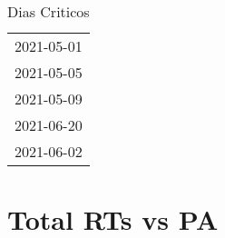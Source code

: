 \documentclass[
]{article}
\author{}
\date{\vspace{-2.5em}}
\begin{document}
\begin{table}[H]
    \centering
    \caption{Dias Criticos}
    \label{tab:dias_criticos}
    \begin{tabular}{c}
        \toprule
        2021-05-01 \\
        2021-05-05 \\
        2021-05-09 \\
        2021-06-20 \\
        2021-06-02 \\
        \bottomrule
    \end{tabular}
\end{table}

\tableofcontents
\newpage
\section{Total RTs vs PA}
\end{document}
